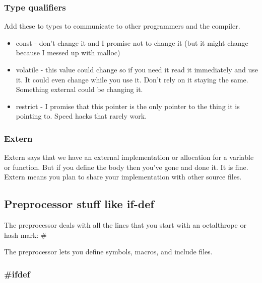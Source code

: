 \documentclass[11pt]{article}
\begin{document}
\subsubsection{Type qualifiers}
\label{sec:orgaafff7d}

Add these to types to communicate to other programmers and the
compiler.

\begin{itemize}
\item const - don't change it and I promise not to change it (but it might
change because I messed up with malloc)
\item volatile - this value could change so if you need it read it
immediately and use it. It could even change while you use it. Don't
rely on it staying the same. Something external could be changing it.
\item restrict - I promise that this pointer is the only pointer to the
thing it is pointing to. Speed hacks that rarely work.
\end{itemize}

\subsubsection{Extern}
\label{sec:org5135e89}

Extern says that we have an external implementation or allocation for
a variable or function. But if you define the body then you've gone
and done it. It is fine. Extern means you plan to share your
implementation with other source files.

\subsection{Preprocessor stuff like if-def}
\label{sec:org45fd33c}
The preprocessor deals with all the lines that you start with an
octalthrope or hash mark: \#

The preprocessor lets you define symbols, macros, and include
files.

\subsubsection{\#ifdef}
\label{sec:org8577782}
\end{document}
